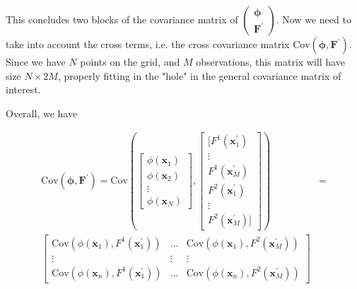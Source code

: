 \documentclass[11pt,a4paper]{article}
\newcommand{\icol}[1]{%
  \left(\begin{smallmatrix}#1\end{smallmatrix}\right)%
}
\begin{document}

This concludes two blocks of the covariance matrix of $\icol{\bm{\phi} \\ \textbf{F}^\prime}$. Now we need to take into account the cross terms, i.e. the cross covariance matrix $\text{Cov}(\bm{\phi}, \textbf{F}^\prime)$. Since we have $N$ points on the grid, and $M$ observations, this matrix will have size $N \times 2M$, properly fitting in the "hole" in the general covariance matrix of interest. 

Overall, we have 

\begin{align*}
    \text{Cov}\left(\bm{\phi}, \textbf{F}^\prime \right) = 
\text{Cov}\left( \begin{bmatrix}
\phi(\textbf{x}_1) \\ \phi(\textbf{x}_2) \\ \vdots \\ \phi(\textbf{x}_N)
\end{bmatrix}, \begin{bmatrix} 
[F^1(\textbf{x}^\prime_1) \\ \vdots \\ F^1(\textbf{x}^\prime_M) \\ F^2(\textbf{x}^\prime_1) \\ \vdots \\ F^2(\textbf{x}^\prime_M) ]
\end{bmatrix}
\right) &= \\ 
\begin{bmatrix}
\text{Cov}(\phi(\textbf{x}_1),F^1(\textbf{x}_1^\prime)) & \hdots & \text{Cov}(\phi(\textbf{x}_1),F^2(\textbf{x}_M^\prime)) \\
\vdots & \vdots & \vdots \\
\text{Cov}(\phi(\textbf{x}_n),F^1(\textbf{x}_1^\prime)) & \hdots & \text{Cov}(\phi(\textbf{x}_n),F^2(\textbf{x}_M^\prime)) 
\end{bmatrix}
\end{align*}
\newline

\end{document}

